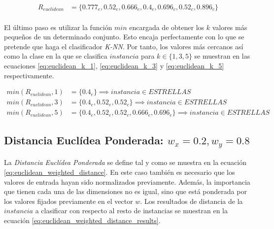 \documentclass{article}
\begin{document}
			\begin{align}
			\label{eq:euclidean_distance_results}
				R_{euclidean} &= \{0.777_e, 0.52_e, 0.666_e, 0.4_e, 0.696_c, 0.52_c, 0.896_c\}
			\end{align}

			\paragraph{}
			El último paso es utilizar la función $min$ encargada de obtener los $k$ valores más pequeños de un determinado conjunto. Esto encaja perfectamente con lo que se pretende que haga el clasificador \emph{K-NN}. Por tanto, los valores más cercanos así como la clase en la que se clasifica $instancia$ para $k \in \{1,3,5\}$ se muestran en las ecuaciones \eqref{eq:euclidean_k_1}, \eqref{eq:euclidean_k_3} y \eqref{eq:euclidean_k_5} respectivamente.

			\begin{align}
			\label{eq:euclidean_k_1}
				min(R_{euclidean},1) &= \{ 0.4_e \} \implies instancia \in ESTRELLAS \\
			\label{eq:euclidean_k_3}
				min(R_{euclidean},3) &= \{ 0.4_e, 0.52_e, 0.52_c\} \implies instancia \in ESTRELLAS \\
			\label{eq:euclidean_k_5}
				min(R_{euclidean},5) &= \{ 0.4_e, 0.52_e, 0.52_c, 0.666_e,  0.696_e \} \implies instancia \in ESTRELLAS
			\end{align}

		\subsection{Distancia Euclídea Ponderada: $w_x=0.2, w_y=0.8$}
		\label{sec:euclidean_weighted}

			\paragraph{}
			La \emph{Distancia Euclídea Ponderada} se define tal y como se muestra en la ecuación \eqref{eq:euclidean_weighted_distance}. En este caso también es necesario que los valores de entrada hayan sido normalizados previamente. Además, la importancia que tienen cada una de las dimensiones no es igual, sino que está ponderada por los valores fijados previamente en el vector $w$. Los resultados de distancia de la $instancia$ a clasificar con respecto al resto de instancias se muestran en la ecuación \eqref{eq:euclidean_weighted_distance_results}.
\end{document}

